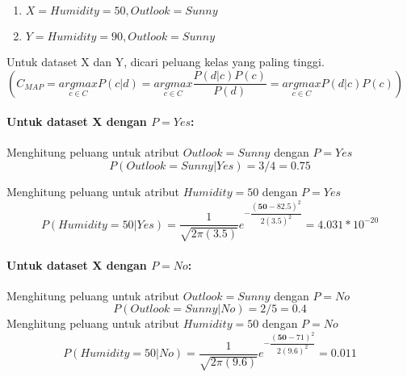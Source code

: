 \begin{enumerate}
	\item $X = {Humidity = 50, Outlook = Sunny}$
	\item $Y = {Humidity = 90, Outlook = Sunny}$
\end{enumerate}
		
Untuk dataset X dan Y, dicari peluang kelas yang paling tinggi. \\
		
$( C_{MAP} = \underset{c \in C}{ argmax } P(c|d) = \underset{c \in C}{ argmax } \dfrac{P(d|c) P(c)}{P(d)} = \underset{c \in C}{ argmax } P(d|c) P(c) )$
		
\paragraph{Untuk dataset X dengan $P=Yes$:}
	Menghitung peluang untuk atribut $Outlook=Sunny$ dengan $P=Yes$
	\begin{equation}
			P(Outlook=Sunny|Yes) = 3/4 
			= 0.75
	\end{equation}
	
	Menghitung peluang untuk atribut $Humidity=50$ dengan $P=Yes$
		\begin{equation}
			P(Humidity=50|Yes) 
			= \dfrac{1}{\sqrt{2\pi(3.5)}}e^{-\dfrac{(\textbf{50}-82.5)^2}{2(3.5)^2}}
			= 4.031*10^{-20}
		\end{equation}
	
	\paragraph{Untuk dataset X dengan $P=No$:}
		Menghitung peluang untuk atribut $Outlook=Sunny$ dengan $P=No$
		\begin{equation}
			P(Outlook=Sunny|No) = 2/5 
			= 0.4
		\end{equation}
		Menghitung peluang untuk atribut $Humidity=50$ dengan $P=No$
		\begin{equation}
			P(Humidity=50|No) 
			= \dfrac{1}{\sqrt{2\pi(9.6)}}e^{-\dfrac{(\textbf{50}-71)^2}{2(9.6)^2}}
			= 0.011
		\end{equation}
